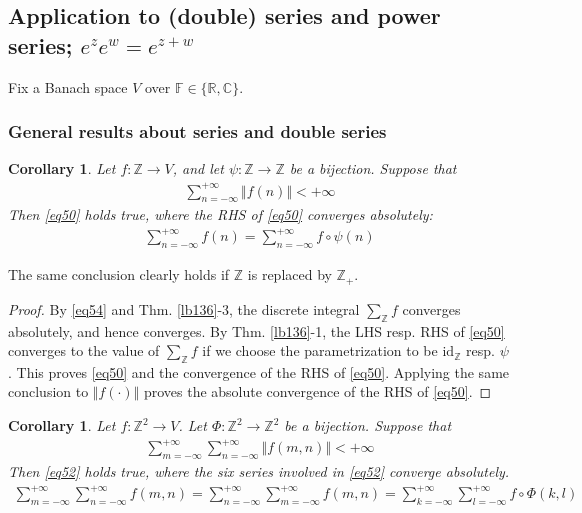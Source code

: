 \documentclass[12pt,b5paper,notitlepage]{article}
\theoremstyle{definition}
\theoremstyle{plain}
\newtheorem{co}[df]{Corollary}
\newcommand{\id}{\mathrm{id}}
\newcommand{\Cbb}{\mathbb C}
\newcommand{\Zbb}{\mathbb Z}
\newcommand{\Rbb}{\mathbb R}
\newcommand{\Fbb}{\mathbb F}
\numberwithin{equation}{section}
\begin{document}
\subsection{Application to (double) series and power series; $e^ze^w=e^{z+w}$}

Fix a Banach space $V$ over $\Fbb\in\{\Rbb,\Cbb\}$.

\subsubsection{General results about series and double series}

\begin{co}\label{lb140}
Let $f:\Zbb\rightarrow V$, and let $\psi:\Zbb\rightarrow\Zbb$ be a bijection. Suppose that
\begin{align}
\sum_{n=-\infty}^{+\infty}\Vert f(n)\Vert<+\infty \label{eq54}
\end{align}
Then \eqref{eq50} holds true, where the RHS of \eqref{eq50} converges absolutely:
\begin{align}
\sum_{n=-\infty}^{+\infty} f(n)=\sum_{n=-\infty}^{+\infty}f\circ\psi(n) \label{eq50}
\end{align}
\end{co}
The same conclusion clearly holds if $\Zbb$ is replaced by $\Zbb_+$.

\begin{proof}
By \eqref{eq54} and Thm. \ref{lb136}-3, the discrete integral $\sum_\Zbb f$ converges absolutely, and hence converges. By Thm. \ref{lb136}-1, the LHS resp. RHS of \eqref{eq50} converges to the value of $\sum_\Zbb f$ if we choose the parametrization to be $\id_\Zbb$ resp. $\psi$. This proves \eqref{eq50} and the convergence of the RHS of \eqref{eq50}. Applying the same conclusion to $\Vert f(\cdot)\Vert$ proves the absolute convergence of the RHS of \eqref{eq50}.
\end{proof}


\begin{co}\label{lb139}
Let $f:\Zbb^2\rightarrow V$. Let $\Phi:\Zbb^2\rightarrow\Zbb^2$ be a bijection. Suppose that
\begin{align}\label{eq51}
\sum_{m=-\infty}^{+\infty}\sum_{n=-\infty}^{+\infty}\Vert f(m,n)\Vert<+\infty
\end{align}
Then \eqref{eq52} holds true, where the six series involved in \eqref{eq52} converge absolutely.
\begin{align}\label{eq52}
\sum_{m=-\infty}^{+\infty}\sum_{n=-\infty}^{+\infty} f(m,n)=\sum_{n=-\infty}^{+\infty}\sum_{m=-\infty}^{+\infty}f(m,n)=\sum_{k=-\infty}^{+\infty}\sum_{l=-\infty}^{+\infty} f\circ\Phi(k,l)
\end{align}
\end{co}
\end{document}
